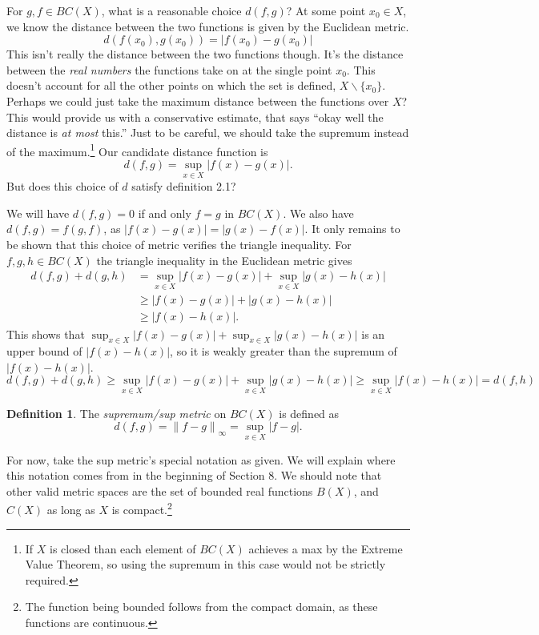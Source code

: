 \documentclass{article}
\newcommand{\norm}[1]{\left\lVert#1\right\rVert}
\theoremstyle{definition}
\newtheorem{definition}{Definition}[section]
\begin{document}
For $ g,f\in BC(X) $, what is a reasonable choice $ d(f,g) $? At some point $ x_0\in X $, we know the distance between the two functions is given by the Euclidean metric. $$d(f(x_0),g(x_0))=|f(x_0)-g(x_0)| $$ This isn't really the distance between the two functions though. It's the distance between the \textit{real numbers} the functions take on at the single point $ x_0 $. This doesn't account for all the other points on which the set is defined, $ X\backslash\{x_0\} $. Perhaps we could just take the maximum distance between the functions over $ X $? This would provide us with a conservative estimate, that says ``okay well the distance is \textit{at most} this.'' Just to be careful, we should take the supremum instead of the maximum.\footnote{If $ X $ is closed than each element of $ BC(X) $ achieves a max by the Extreme Value Theorem, so using the supremum in this case would not be strictly required.} Our candidate distance function is $$d(f,g)=\sup_{x\in X}|f(x)-g(x)| .$$
But does this choice of $ d $ satisfy definition 2.1?

We will have $ d(f,g)=0 $ if and only $ f=g $ in $ BC(X) $. We also have $ d(f,g)=f(g,f) $, as $ |f(x)-g(x)|=|g(x)-f(x)|  $. It only remains to be shown that this choice of metric verifies the triangle inequality. For $ f,g,h\in BC(X) $ the triangle inequality in the Euclidean metric gives  
\begin{align*}
	d(f,g)+d(g,h)&=\sup_{x\in X}|f(x)-g(x)|+\sup_{x\in X}|g(x)-h(x)|\\
				 &\ge |f(x)-g(x)|+|g(x)-h(x)|\\
				 &\ge |f(x)-h(x)|.
\end{align*}
This shows that $ \sup_{x\in X}|f(x)-g(x)|+\sup_{x\in X}|g(x)-h(x)| $ is an upper bound of $ |f(x)-h(x)| $, so it is weakly greater than the supremum of $ |f(x)-h(x)| $.
$$	d(f,g)+d(g,h)\ge \sup_{x\in X}|f(x)-g(x)|+\sup_{x\in X}|g(x)-h(x)|\ge \sup_{x\in X} |f(x)-h(x)|=d(f,h) $$
\begin{definition}
	The \textit{\color{red}supremum/sup metric} on $ BC(X) $ is defined as $$d(f,g)=\norm{f-g}_\infty=\sup_{x\in X}|f-g|. $$
\end{definition}
For now, take the sup metric's special notation as given. We will explain where this notation comes from in the beginning of Section 8. We should note that other valid metric spaces are the set of bounded real functions $ B(X) $, and $ C(X) $ as long as $ X $ is compact.\footnote{The function being bounded follows from the compact domain, as these functions are continuous. }
\end{document}
